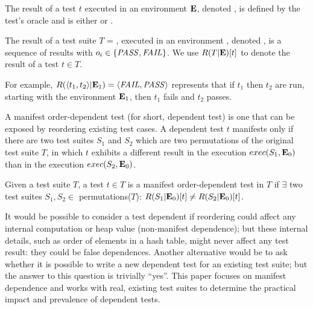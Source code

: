 \begin{definition}
The result of a test $t$ executed in an environment\/ $\mathbf{E}$,
denoted\/ , is defined by the test's oracle
and is either \pass or \fail.

The result of a test suite\/ $T$ = , executed in an
environment\/ \env, denoted\/ , is a
sequence of results\/  with $o_i \in \{\mathit{PASS},\mathit{FAIL}\}$.
We use $R(T|\mathbf{E})[t]$ to denote the result of a test $t \in T$.


For example, $R( \langle t_1, t_2 \rangle |\mathbf{E}_1) =  \langle \mathit{FAIL}, \mathit{PASS} \rangle $ represents that if
$t_1$ then $t_2$ are run, starting with the environment\/ $\mathbf{E}_1$, then\/
$t_1$ fails and\/ $t_2$ passes.
\end{definition}

A manifest order-dependent test (for short, dependent test)
is one that can be exposed by 
reordering existing test cases.
A dependent test $t$ manifests only
if there are two test suites $S_1$ and $S_2$ which
are two permutations of the original test suite $T$,
in which $t$ exhibits a different result
in the execution $exec(S_1,\mathbf{E}_0)$
than in the execution $exec(S_2,\mathbf{E}_0)$.

\begin{definition} \label{def:manifest}
Given a test suite\/ $T$, a test $t \in T$ is a
manifest order-dependent test in $T$ if $\exists$ two test suites
$S_1, S_2 \in$ permutations($T$):
$R(S_1|\mathbf{E}_0)[t] \neq
R(S_2|\mathbf{E}_0)[t]$.
%
\end{definition}

It would be possible to consider a test dependent if reordering could
affect any internal computation or heap value (non-manifest dependence);
but these internal details, such as order of elements in a hash table,
might never affect any test result: they could be false dependences.
Another alternative would be to ask
whether it is possible to write a new dependent test for an existing
test suite; but the answer to this question is trivially ``yes''.
This paper focuses on manifest dependence and works with real, existing
test suites to determine the practical impact and prevalence of dependent
tests.


